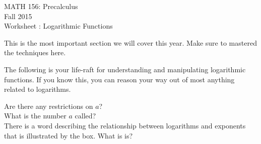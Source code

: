 \documentclass[11pt]{article}
\newcommand{\sect}{\textsection}
\begin{document}
 

\begin{center}MATH 156: Precalculus  \\ Fall 2015 \\ Worksheet \sect 4.3: Logarithmic Functions\end{center}

\hrulefill

This is the most important section we will cover this year. Make sure to mastered the techniques here.\\

\hrulefill

The following is your life-raft for understanding and manipulating logarithmic functions. If you know this, you can reason your way out of most anything related to logarithms.\\

\begin{center}
\setlength{\fboxsep}{15pt}
\end{center}

Are there any restrictions on $a$?\\

What is the number $a$ called?\\

There is a word describing the relationship between logarithms and exponents that is illustrated by the box. What is is?\\

\hrulefill 
\end{document}
